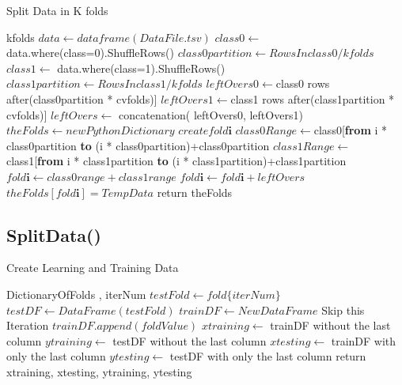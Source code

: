 \documentclass{article}
\begin{document}
\begin{algorithm}[H]
\caption{Split Data in K folds}
\begin{algorithmic}[1]
\REQUIRE kfolds  
\STATE $ data \gets dataframe(DataFile.tsv)$
\STATE $ class0 \gets $ data.where(class=0).ShuffleRows() 
\STATE $ class0partition \gets  Rows In class0 / kfolds $
\STATE $ class1 \gets $ data.where(class=1).ShuffleRows()
\STATE $ class1partition \gets  Rows In class1 / kfolds $
\STATE $ leftOvers0 \gets $class0 rows after(class0partition * cvfolds)]
\STATE $ leftOvers1 \gets $class1 rows after(class1partition * cvfolds)]
\STATE $ leftOvers \gets $ concatenation( leftOvers0, leftOvers1)
\STATE $ theFolds \gets newPythonDictionary$
        \STATE  $create fold\textbf{i} $  
      	\STATE $class0Range \gets $class0[\textbf{from} i * class0partition \textbf{to} (i * class0partition)+class0partition  
      	\STATE $class1Range \gets$ class1[\textbf{from} i * class1partition \textbf{to} (i * class1partition)+class1partition   
      	\STATE $fold\textbf{i} \gets class0range + class1range  $
	  	\STATE $fold\textbf{i} \gets fold\textbf{i} + leftOvers $ 
		\ENDIF	
    \STATE $theFolds[fold\textbf{i}] = TempData $  	
	\ENDFOR
\STATE return theFolds 
\end{algorithmic}
\end{algorithm}

 \subsection{SplitData()}
\begin{algorithm}[H]
\caption{Create Learning and Training Data}
\begin{algorithmic}[1]
\REQUIRE DictionaryOfFolds , iterNum 
\STATE $ testFold \gets fold\{iterNum\}$ 
\STATE $testDF \gets DataFrame(testFold) $
\STATE $trainDF \gets NewDataFrame $
		  	\STATE Skip this Iteration 
		\ENDIF
        \STATE $trainDF.append(foldValue)$
  	\ENDFOR
\STATE $xtraining \gets $ trainDF without the last column 
\STATE $ytraining \gets $ testDF without the last column
\STATE $xtesting \gets $ trainDF with only the last column
\STATE $ytesting \gets $ testDF with only the last column
\STATE return xtraining, xtesting, ytraining, ytesting

\end{algorithmic}
\end{algorithm}
\end{document}
